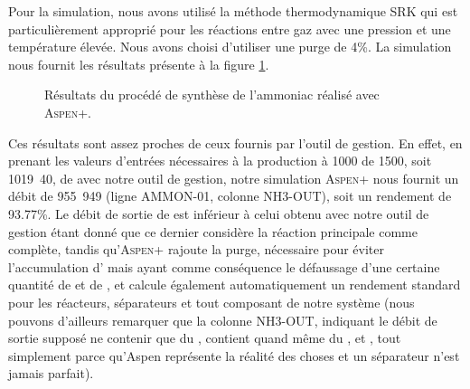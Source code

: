 Pour la simulation, nous avons utilisé la méthode
thermodynamique \textsc{SRK} qui est particulièrement
approprié pour les réactions entre gaz avec une pression
et une température élevée. Nous avons choisi d'utiliser
une purge de 4\%. La simulation nous fournit les résultats
présente à la figure \ref{fig:resultats-aspen}.

\begin{figure}
	\centering
	\caption{Résultats du procédé de synthèse de l'ammoniac
	réalisé avec \textsc{Aspen+}.}
	\label{fig:resultats-aspen}
\end{figure}

Ces résultats sont assez proches de ceux fournis par
l'outil de gestion. En effet, en prenant les valeurs
d'entrées nécessaires à la production à \unit{1000}{\kelvin} de
\unit{1500}{\ton\per\dday}, soit \unit{1019.40}{\mole\per\second},
de  avec notre outil de gestion, notre simulation \textsc{Aspen+}
nous fournit un débit de \unit{955.949}{\mole\per\second} (ligne AMMON-01, colonne NH3-OUT),
soit un rendement de 93.77\%. Le débit de sortie de 
est inférieur à celui obtenu avec notre outil de gestion étant donné que
ce dernier considère la réaction principale comme complète, tandis qu'\textsc{Aspen+}
rajoute la purge, nécessaire pour éviter l'accumulation d'
mais ayant comme conséquence le défaussage d'une certaine quantité de
 et de , et calcule également automatiquement un rendement
standard pour les réacteurs, séparateurs et tout composant de notre système
(nous pouvons d'ailleurs remarquer que la colonne NH3-OUT, indiquant le débit
de sortie supposé ne contenir que du , contient quand même du 
,  et , 
tout simplement parce qu'Aspen représente la réalité des choses et 
un séparateur n'est jamais parfait).



